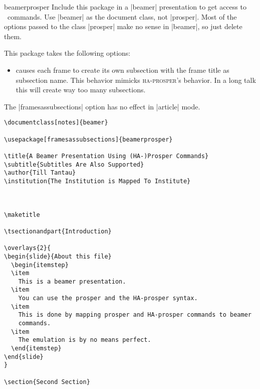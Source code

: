 \begin{package}{{beamerprosper}}
  Include this package in a |beamer| presentation to get access to \prosper\ commands. Use |beamer| as the document class, not |prosper|. Most of the options passed to the class |prosper| make no sense in |beamer|, so just delete them.

  This package takes the following options:
  \begin{itemize}
  \item
     causes each frame to create its own subsection with the frame title as subsection name. This behavior mimicks \textsc{ha}-\textsc{prosper}'s behavior. In a long talk this will create way too many subsections.
  \end{itemize}

  \articlenote
  The |framesassubsections| option has no effect in |article| mode.

  \example
\begin{verbatim}
\documentclass[notes]{beamer}

\usepackage[framesassubsections]{beamerprosper}

\title{A Beamer Presentation Using (HA-)Prosper Commands}
\subtitle{Subtitles Are Also Supported}
\author{Till Tantau}
\institution{The Institution is Mapped To Institute}



\maketitle

\tsectionandpart{Introduction}

\overlays{2}{
\begin{slide}{About this file}
  \begin{itemstep}
  \item
    This is a beamer presentation.
  \item
    You can use the prosper and the HA-prosper syntax.
  \item
    This is done by mapping prosper and HA-prosper commands to beamer
    commands.
  \item
    The emulation is by no means perfect.
  \end{itemstep}
\end{slide}
}

\section{Second Section}

\end{verbatim}
\end{package}
